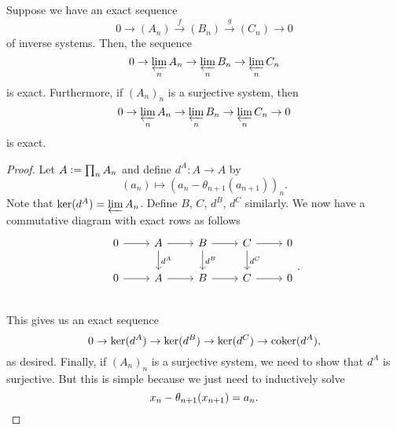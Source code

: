 \begin{prop} \label{prop:completion-exact-properties}
	Suppose we have an exact sequence
	\begin{equation*} 
		0 \to (A_{n}) \xrightarrow{f} (B_{n}) \xrightarrow{g} (C_{n}) \to 0
	\end{equation*}
	of inverse systems. Then, the sequence
	\begin{equation*} 
		0 \to \varprojlim_{n} A_{n} \to \varprojlim_{n} B_{n} \to \varprojlim_{n} C_{n}
	\end{equation*}
	is exact. Furthermore, if $(A_{n})_{n}$ is a surjective system, then
	\begin{equation*} 
		0 \to \varprojlim_{n} A_{n} \to \varprojlim_{n} B_{n} \to \varprojlim_{n} C_{n} \to 0
	\end{equation*}
	is exact.
\end{prop}
\begin{proof} 
	Let $A \vcentcolon= \prod_{n} A_{n}$ and define $d^{A} : A \to A$ by 
	\begin{equation*} 
		(a_{n}) \mapsto (a_{n} - \theta_{n + 1}(a_{n + 1}))_{n}.
	\end{equation*}
	Note that $\ker(d^{A}) = \varprojlim A_{n}$. Define $B$, $C$, $d^{B}$, $d^{C}$ similarly. We now have a commutative diagram with exact rows as follows
	\begin{equation*} 
		\begin{tikzcd}
			0 \arrow[r] & A \arrow[r] \arrow[d, "d^{A}"] & B \arrow[r] \arrow[d, "d^{B}"] & C \arrow[r] \arrow[d, "d^{C}"] & 0 \\
			0 \arrow[r] & A \arrow[r] & B \arrow[r] & C \arrow[r] & 0 \\
		\end{tikzcd}.
	\end{equation*}
	This gives us an exact sequence
	\begin{equation*} 
		0 \to \ker(d^{A}) \to \ker(d^{B}) \to \ker(d^{C}) \to \operatorname{coker}(d^{A}),
	\end{equation*}
	as desired. Finally, if $(A_{n})_{n}$ is a surjective system, we need to show that $d^{A}$ is surjective. But this is simple because we just need to inductively solve
	\begin{equation*} 
		x_{n} - \theta_{n + 1}(x_{n + 1}) = a_{n}. \qedhere
	\end{equation*}
\end{proof}

